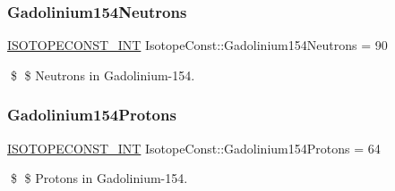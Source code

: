 \subsubsection{\texorpdfstring{Gadolinium154\+Neutrons}{Gadolinium154Neutrons}}
{\footnotesize\ttfamily \mbox{\hyperlink{group___isotope_const-_macros_ga5f18360b3e99483a35c32d789e62621c}{I\+S\+O\+T\+O\+P\+E\+C\+O\+N\+S\+T\+\_\+\+I\+NT}} Isotope\+Const\+::\+Gadolinium154\+Neutrons = 90}

\$ \$ Neutrons in Gadolinium-\/154. \mbox{\label{group___isotope_const-_gadolinium-_gd154_ga5947b2ec1ad1e1ed9261c68c5398921d}} 
\subsubsection{\texorpdfstring{Gadolinium154\+Protons}{Gadolinium154Protons}}
{\footnotesize\ttfamily \mbox{\hyperlink{group___isotope_const-_macros_ga5f18360b3e99483a35c32d789e62621c}{I\+S\+O\+T\+O\+P\+E\+C\+O\+N\+S\+T\+\_\+\+I\+NT}} Isotope\+Const\+::\+Gadolinium154\+Protons = 64}

\$ \$ Protons in Gadolinium-\/154. 
